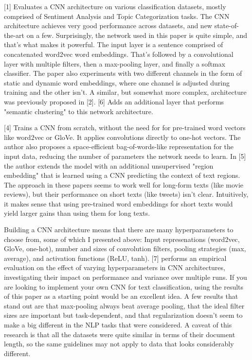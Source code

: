[1] Evaluates a CNN architecture on various classification datasets, mostly comprised of Sentiment Analysis and Topic Categorization tasks. The CNN architecture achieves very good performance across datasets, and new state-of-the-art on a few. Surprisingly, the network used in this paper is quite simple, and that's what makes it powerful. The input layer is a sentence comprised of concatenated word2vec word embeddings. That's followed by a convolutional layer with multiple filters, then a max-pooling layer, and finally a softmax classifier. The paper also experiments with two different channels in the form of static and dynamic word embeddings, where one channel is adjusted during training and the other isn't. A similar, but somewhat more complex, architecture was previously proposed in [2]. [6] Adds an additional layer that performs "semantic clustering" to this network architecture.

[4] Trains a CNN from scratch, without the need for for pre-trained word vectors like word2vec or GloVe. It applies convolutions directly to one-hot vectors. The author also proposes a space-efficient bag-of-words-like representation for the input data, reducing the number of parameters the network needs to learn. In [5] the author extends the model with an additional unsupervised "region embedding" that is learned using a CNN predicting the context of text regions. The approach in these papers seems to work well for long-form texts (like movie reviews), but their performance on short texts (like tweets) isn't clear. Intuitively, it makes sense that using pre-trained word embeddings for short texts would yield larger gains than using them for long texts.

Building a CNN architecture means that there are many hyperparameters to choose from, some of which I presented above: Input represenations (word2vec, GloVe, one-hot), number and sizes of convolution filters, pooling strategies (max, average), and activation functions (ReLU, tanh). [7] performs an empirical evaluation on the effect of varying hyperparameters in CNN architectures, investigating their impact on performance and variance over multiple runs. If you are looking to implement your own CNN for text classification, using the results of this paper as a starting point would be an excellent idea. A few results that stand out are that max-pooling always beat average pooling, that the ideal filter sizes are important but task-dependent, and that regularization doesn't seem to make a big different in the NLP tasks that were considered. A caveat of this research is that all the datasets were quite similar in terms of their document length, so the same guidelines may not apply to data that looks considerably different.

